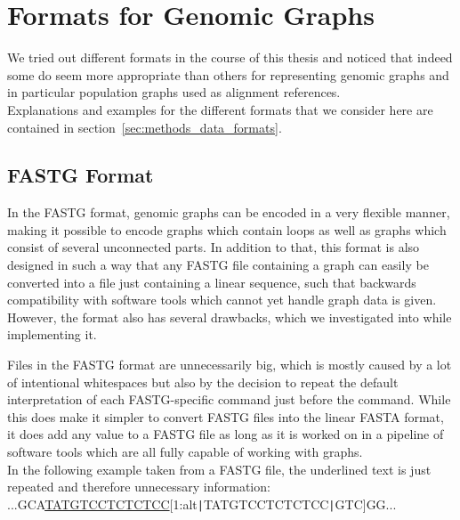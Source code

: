 \documentclass[a4paper,12pt,twoside,BCOR=10mm]{scrbook}
\def\pipe{\texttt{|}}
\begin{document}
\section{Formats for Genomic Graphs}
\label{sec:results_data_formats}
%

We tried out different formats in the course of this thesis 
and noticed that indeed some do seem more appropriate than others 
for representing genomic graphs 
and in particular population graphs used as alignment references. \\
Explanations and examples for the different formats that we consider here 
are contained in section~\ref{sec:methods_data_formats}. 

\subsection{FASTG Format}

In the FASTG format, genomic graphs can be encoded in a very flexible manner, 
making it possible to encode graphs which contain loops as well as graphs 
which consist of several unconnected parts. 
In addition to that, this format is also designed in such a way that any 
FASTG file containing a graph can easily be converted into a file just containing 
a linear sequence, such that backwards compatibility with software tools which 
cannot yet handle graph data is given. \\
However, the format also has several drawbacks, which we investigated into 
while implementing it.

Files in the FASTG format are unnecessarily big, which is mostly caused 
by a lot of intentional whitespaces but also by the decision to repeat the 
default interpretation of each FASTG-specific command just before the command. 
While this does make it simpler to convert FASTG files into the linear FASTA format, 
it does add any value to a FASTG file as long as it is worked on in a pipeline of 
software tools which are all fully capable of working with graphs. \\
In the following example taken from a FASTG file, the underlined 
text is just repeated and therefore unnecessary information: \\
...GCA\underline{TATGTCCTCTCTCC}[1:alt\pipe TATGTCCTCTCTCC\pipe GTC]GG...
\end{document}

